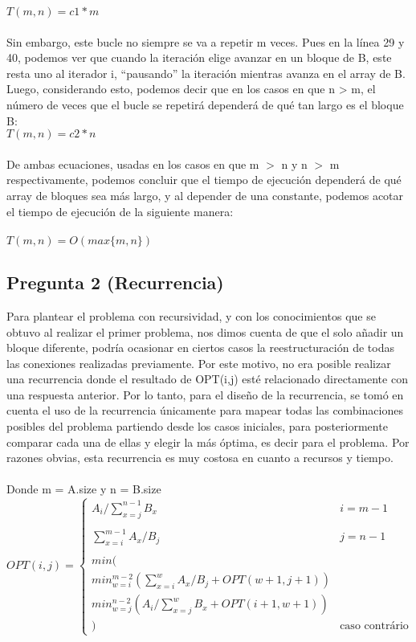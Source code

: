 \documentclass{article}
\begin{document}
	$T(m, n) = c1 * m$\\\\
	Sin embargo, este bucle no siempre se va a repetir m veces. Pues en la línea 29 y 40, podemos ver que cuando la iteración elige avanzar en un bloque de B, este resta uno al iterador i, “pausando” la iteración mientras avanza en el array de B. Luego, considerando esto, podemos decir que en los casos en que n > m, el número de veces que el bucle se repetirá dependerá de qué tan largo es el bloque B:\\
	
	$T(m,n) = c2 * n$\\\\
	De ambas ecuaciones, usadas en los casos en que m $>$ n y n $>$ m respectivamente, podemos concluir que el tiempo de ejecución dependerá de qué array de bloques sea más largo, y al depender de una constante, podemos acotar el tiempo de ejecución de la siguiente manera:\\\\
	
	$T(m,n) = O(max\{m,n\})$
	

	\subsection*{Pregunta 2 (Recurrencia)}
	Para plantear el problema con recursividad, y con los conocimientos que se obtuvo al realizar el primer problema, nos dimos cuenta de que el solo añadir un bloque diferente, podría ocasionar en ciertos casos la reestructuración de todas las conexiones realizadas previamente. Por este motivo, no era posible realizar una recurrencia donde el resultado de OPT(i,j) esté relacionado directamente con una respuesta anterior. Por lo tanto, para el diseño de la recurrencia, se tomó en cuenta el uso de la recurrencia únicamente para mapear todas las combinaciones posibles del problema partiendo desde los casos iniciales, para posteriormente comparar cada una de ellas y elegir la más óptima, es decir para el problema. Por razones obvias, esta recurrencia es muy costosa en cuanto a recursos y tiempo.
	\\\\
	Donde m = A.size y n = B.size
	\begin{equation*}
	OPT(i,j) =
	\begin{cases}
	A_i / \sum_{x=j}^{n-1}B_x & i = m-1\\\\
	\sum_{x=i}^{m-1}A_x / B_j & j = n-1\\\\
	min(\\
	min_{w=i}^{m-2}( \sum_{x=i}^{w}A_x/ B_j + OPT(w+1, j+1))\\
	min_{w=j}^{n-2}(A_i/\sum_{x=j}^{w}B_x + OPT(i+1,w+1))\\
	) & \text{caso contrário}
	\end{cases}
	\end{equation*}
\end{document}

